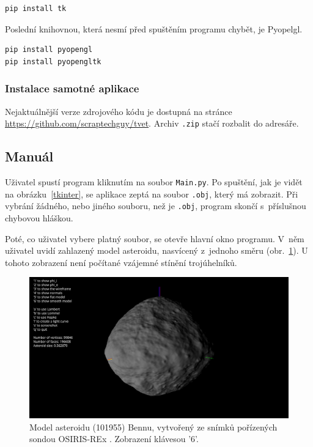 \documentclass[11pt]{article}
\begin{document}
\begin{lstlisting}
pip install tk
\end{lstlisting}

Poslední knihovnou, která nesmí před spuštěním programu chybět, je Pyopelgl.

\begin{lstlisting}
pip install pyopengl
pip install pyopengltk
\end{lstlisting}

\subsubsection{Instalace samotné aplikace}

Nejaktuálnější verze zdrojového kódu je dostupná na stránce \url{https://github.com/scraptechguy/tvet}. Archiv \verb|.zip| stačí rozbalit do adresáře.

\subsection{Manuál}

Uživatel spustí program kliknutím na soubor \verb|Main.py|. Po spuštění, jak je vidět na obrázku~\ref{tkinter}, se aplikace zeptá na soubor \verb|.obj|, který má zobrazit. Při vybrání žádného, nebo jiného souboru, než je \verb|.obj|, program skončí s~příslušnou chybovou hláškou.

Poté, co uživatel vybere platný soubor, se otevře hlavní okno programu. V~něm uživatel uvidí zahlazený model asteroidu, nasvícený z~jednoho směru (obr.~\ref{bennu}). U tohoto zobrazení není počítané vzájemné stínění trojúhelníků. 

\begin{figure}[h]
\includegraphics[width=12cm]{figs/bennu_base.png}
\centering
\caption{Model asteroidu (101955) Bennu,
vytvořený ze snímků pořízených sondou OSIRIS-REx
\cite{Lauretta_2019Sci...366.3544L,Lauretta_2022Sci...377..285L}.
Zobrazení klávesou '6'.}
\label{bennu}
\end{figure}
\end{document}

